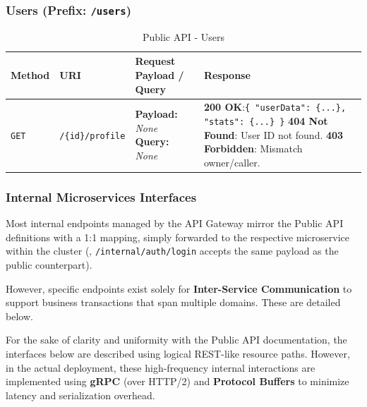 \subsubsection*{Users (Prefix: \texttt{/users})}
\begin{table}[H]
    \sf
    \small
    \centering
    \renewcommand{\arraystretch}{1.5}
    \begin{tabularx}{\textwidth}{|l|p{2.5cm}|p{4cm}|X|}
    \hline
    \rowcolor{lightgray} \textbf{Method} & \textbf{URI} & \textbf{Request Payload / Query} & \textbf{Response} \\ \hline
    
    \texttt{GET} & \texttt{/\{id\}/profile} &
    \textbf{Payload:} \newline \textit{None} \newline \textbf{Query:} \newline \textit{None} & 
    \textbf{200 OK}:\newline \texttt{\{ "userData": \{...\}, \newline"stats": \{...\} \}} \newline
    \textbf{404 Not Found}: User ID not found. \newline
    \textbf{403 Forbidden}: Mismatch owner/caller. \\ \hline
    \end{tabularx}
    \caption{Public API - Users}
    \label{tab:api_public_users}
\end{table}


\subsubsection{Internal Microservices Interfaces}
Most internal endpoints managed by the API Gateway mirror the Public API definitions with a 1:1 mapping, simply forwarded to the respective microservice within the cluster (\eg, \texttt{/internal/auth/login} accepts the same payload as the public counterpart).

However, specific endpoints exist solely for \textbf{Inter-Service Communication} to support business transactions that span multiple domains. These are detailed below.

For the sake of clarity and uniformity with the Public API documentation, the interfaces below are described using logical REST-like resource paths. However, in the actual deployment, these high-frequency internal interactions are implemented using \textbf{gRPC} (over HTTP/2) and \textbf{Protocol Buffers} to minimize latency and serialization overhead.

